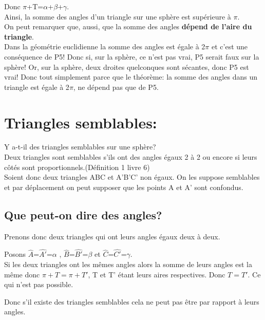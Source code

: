 \documentclass[a4paper, 12pt, twoside]{book}
\begin{document}
Donc $\pi$+T=$\alpha$+$\beta$+$\gamma$.\\


Ainsi, la somme des angles d'un triangle sur une sphère est supérieure à $\pi$.\\

On peut remarquer que, aussi, que la somme des angles \textbf{dépend de l'aire du triangle}.\\


Dans la géométrie euclidienne la somme des angles est égale à 2$\pi$ et c'est une conséquence de P5! Donc si, sur la sphère, ce n'est pas vrai,  P5 serait faux sur la sphère! Or, sur la sphère, deux droites quelconques sont sécantes, donc P5 est vrai! Donc tout simplement parce que le théorème: la somme des angles dans un triangle est égale à  2$\pi$, ne dépend pas que de P5. \\

\newpage   \section{Triangles semblables:}
  
  Y a-t-il des triangles semblables sur une sphère?\\
  
  Deux triangles sont semblables s'ils ont des angles égaux 2 à 2 ou encore si leurs côtés sont proportionnels.(Définition 1 livre 6)\\
  
  Soient donc deux triangles ABC et A'B'C' non égaux. On les suppose semblables et par déplacement on peut supposer que les points A et A' sont confondus.\\
  
  
  \subsection{Que peut-on dire des angles?}
 
  
  Prenons donc deux triangles qui ont leurs angles égaux deux à deux.\
  
  Posons $\hat{A}$=$\hat{A'}$=$\alpha$ , $\hat{B}$=$\hat{B'}$=$\beta$ et $\hat{C}$=$\hat{C'}$=$\gamma$.\\
    
  Si les deux triangles ont les mêmes angles alors la somme de leurs angles est la même donc $\pi+T=\pi+T'$, T et T' étant leurs aires respectives. Donc $T=T'$. Ce qui n'est pas possible.\
 
 Donc s'il existe des triangles semblables cela ne peut pas être par rapport à leurs angles. \\\
 
\end{document}
